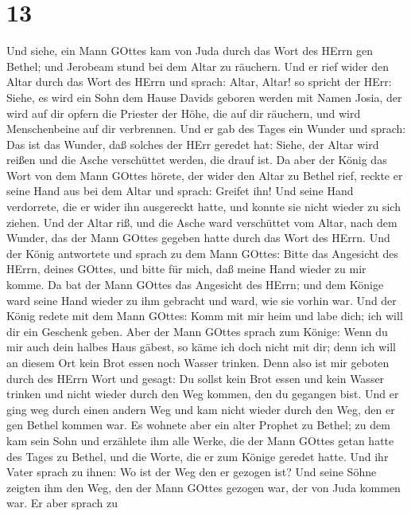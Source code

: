 \hypertarget{section-12}{%
\section{13}\label{section-12}}

 Und siehe, ein Mann GOttes kam von Juda durch das Wort des
HErrn gen Bethel; und Jerobeam stund bei dem Altar zu räuchern.
 Und er rief wider den Altar durch das Wort des HErrn und
sprach: Altar, Altar! so spricht der HErr: Siehe, es wird ein Sohn dem
Hause Davids geboren werden mit Namen Josia, der wird auf dir opfern die
Priester der Höhe, die auf dir räuchern, und wird Menschenbeine auf dir
verbrennen.  Und er gab des Tages ein Wunder und sprach: Das
ist das Wunder, daß solches der HErr geredet hat: Siehe, der Altar wird
reißen und die Asche verschüttet werden, die drauf ist.  Da
aber der König das Wort von dem Mann GOttes hörete, der wider den Altar
zu Bethel rief, reckte er seine Hand aus bei dem Altar und sprach:
Greifet ihn! Und seine Hand verdorrete, die er wider ihn ausgereckt
hatte, und konnte sie nicht wieder zu sich ziehen.  Und der
Altar riß, und die Asche ward verschüttet vom Altar, nach dem Wunder,
das der Mann GOttes gegeben hatte durch das Wort des HErrn. 
Und der König antwortete und sprach zu dem Mann GOttes: Bitte das
Angesicht des HErrn, deines GOttes, und bitte für mich, daß meine Hand
wieder zu mir komme. Da bat der Mann GOttes das Angesicht des HErrn; und
dem Könige ward seine Hand wieder zu ihm gebracht und ward, wie sie
vorhin war.  Und der König redete mit dem Mann GOttes: Komm
mit mir heim und labe dich; ich will dir ein Geschenk geben.
 Aber der Mann GOttes sprach zum Könige: Wenn du mir auch
dein halbes Haus gäbest, so käme ich doch nicht mit dir; denn ich will
an diesem Ort kein Brot essen noch Wasser trinken.  Denn
also ist mir geboten durch des HErrn Wort und gesagt: Du sollst kein
Brot essen und kein Wasser trinken und nicht wieder durch den Weg
kommen, den du gegangen bist.  Und er ging weg durch einen
andern Weg und kam nicht wieder durch den Weg, den er gen Bethel kommen
war.  Es wohnete aber ein alter Prophet zu Bethel; zu dem
kam sein Sohn und erzählete ihm alle Werke, die der Mann GOttes getan
hatte des Tages zu Bethel, und die Worte, die er zum Könige geredet
hatte.  Und ihr Vater sprach zu ihnen: Wo ist der Weg den
er gezogen ist? Und seine Söhne zeigten ihm den Weg, den der Mann GOttes
gezogen war, der von Juda kommen war.  Er aber sprach zu
